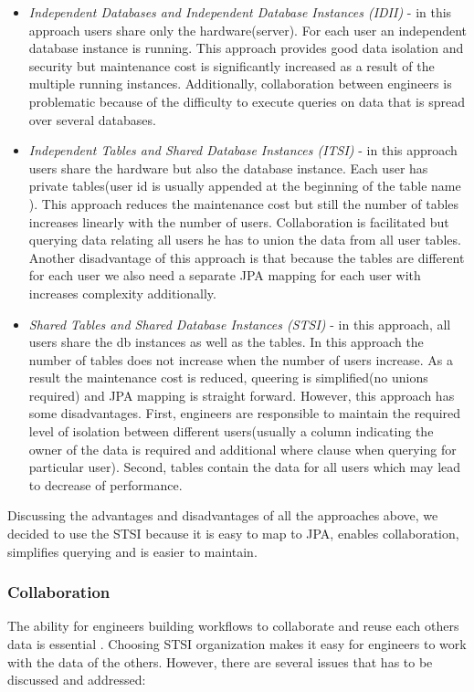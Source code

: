 \documentclass[a4paper, notitlepage]{article}
\begin{document}
\begin{itemize}
	\item \textit{Independent Databases and Independent Database Instances (IDII)} - in this approach users share only the hardware(server). For each user an independent database instance is running. This approach provides good data isolation and security but maintenance cost is significantly increased as a result of the multiple running instances. Additionally, collaboration between engineers is problematic because of the difficulty to execute queries on data that is spread over several databases.  
	
	\item \textit{Independent Tables and Shared Database Instances (ITSI)} - in this approach users share the hardware but also the database instance. Each user has private tables(user id is usually appended at the beginning of the table name \cite{Hui}). This approach reduces the maintenance cost but still the number of tables increases linearly with the number of users. Collaboration is facilitated but querying data relating all users he has to union the data from all user tables. Another disadvantage of this approach is that because the tables are different for each user we also need a separate JPA mapping for each user with increases complexity additionally.
	
	\item \textit{Shared Tables and Shared Database Instances (STSI)} - in this approach, all users share the db instances as well as the tables. In this approach the number of tables does not increase when the number of users increase. As a result the maintenance cost is reduced, queering is simplified(no unions required) and JPA mapping is straight forward. However, this approach has some disadvantages. First, engineers are responsible to maintain the required level of isolation between different users(usually a column indicating the owner of the data is required and additional where clause when querying for particular user). Second, tables contain the data for all users which may lead to decrease of performance.
	
\end{itemize}

Discussing the advantages and disadvantages of all the approaches above, we decided to use the STSI because it is easy to map to JPA, enables collaboration, simplifies querying and is easier to maintain.    

\subsubsection{Collaboration}
The ability for engineers building workflows to collaborate and reuse each others data is essential \cite{Lu}. Choosing STSI organization makes it easy for engineers to work with the data of the others. However, there are several issues that has to be discussed and addressed:
\end{document}
